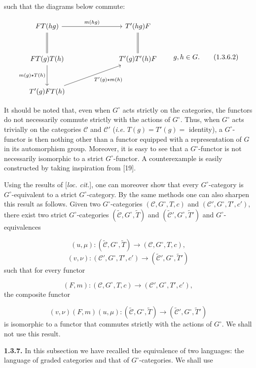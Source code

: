 %
such that the diagrams below commute:

\begin{equation}
  \begin{tikzcd}[column sep=7em,row sep=3em]
    FT(hg) \arrow[r,"m(hg)"] \arrow[d,equal] &
      T'(hg)F \arrow[d,equal] \\
    FT(g)T(h) \arrow[d,"m(g)\mathbin{\star}T(h)"'] &
      T'(g)T'(h)F \\
    T'(g)FT(h) \arrow[ur,"T'(g)\mathbin{\star}m(h)"'] &
  \end{tikzcd}
  \qquad g,h\in G.
  \tag{1.3.6.2}
\end{equation}

It should be noted that, even when $G^\circ$ acts strictly on the
categories, the functors do not necessarily commute strictly with the
actions of $G^\circ$. Thus, when $G^\circ$ acts trivially on the
categories $\mathcal C$ and $\mathcal C'$ (\textit{i.e.}
$T(g)=T'(g)=$ identity), a $G^\circ$-functor is then nothing other than
a functor equipped with a representation of $G$ in its automorphism
group. Moreover, it is easy to see that a $G^\circ$-functor is not
necessarily isomorphic to a strict $G^\circ$-functor. A counterexample
is easily constructed by taking inspiration from [19].

Using the results of [\emph{loc. cit.}], one can moreover show that every
$G^\circ$-category is $G^\circ$-equivalent to a strict
$G^\circ$-category. By the same methods one can also sharpen this result
as follows. Given two $G^\circ$-categories
$(\mathcal C,G^\circ,T,c)$ and $(\mathcal C',G^\circ,T',c')$, there
exist two strict $G^\circ$-categories
$(\widetilde{\mathcal C},G^\circ,\widetilde T)$ and
$(\widetilde{\mathcal C}',G^\circ,\widetilde T')$ and
$G^\circ$-equivalences

\[
  (u,\mu)\colon
  (\widetilde{\mathcal C},G^\circ,\widetilde T)
  \longrightarrow
  (\mathcal C,G^\circ,T,c),
\]
\[
  (v,\nu)\colon
  (\mathcal C',G^\circ,T',c')
  \longrightarrow
  (\widetilde{\mathcal C}',G^\circ,\widetilde T')
\]
such that for every functor

\[
  (F,m)\colon
  (\mathcal C,G^\circ,T,c)
  \longrightarrow
  (\mathcal C',G^\circ,T',c'),
\]
the composite functor

\[
  (v,\nu)(F,m)(u,\mu)\colon
  (\widetilde{\mathcal C},G^\circ,\widetilde T)
  \longrightarrow
  (\widetilde{\mathcal C}',G^\circ,\widetilde T')
\]
is isomorphic to a functor that commutes strictly with the actions of
$G^\circ$. We shall not use this result.

\noindent\textbf{1.3.7.}\quad
In this subsection we have recalled the equivalence of two languages:
the language of graded categories and that of $G^\circ$-categories. We
shall use
